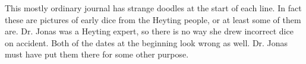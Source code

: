 This mostly ordinary journal has strange doodles at the start of each line.
In fact these are pictures of early dice from the Heyting people, or at least some of them are.
Dr. Jonas was a Heyting expert, so there is no way she drew incorrect dice on accident.
Both of the dates at the beginning look wrong as well.
Dr. Jonas must have put them there for some other purpose.
